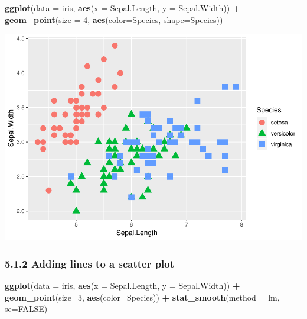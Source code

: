 \documentclass[]{article}
\newenvironment{Shaded}{\begin{snugshade}}{\end{snugshade}}
\newcommand{\KeywordTok}[1]{\textcolor[rgb]{0.13,0.29,0.53}{\textbf{#1}}}
\newcommand{\DataTypeTok}[1]{\textcolor[rgb]{0.13,0.29,0.53}{#1}}
\newcommand{\DecValTok}[1]{\textcolor[rgb]{0.00,0.00,0.81}{#1}}
\newcommand{\StringTok}[1]{\textcolor[rgb]{0.31,0.60,0.02}{#1}}
\newcommand{\OtherTok}[1]{\textcolor[rgb]{0.56,0.35,0.01}{#1}}
\newcommand{\OperatorTok}[1]{\textcolor[rgb]{0.81,0.36,0.00}{\textbf{#1}}}
\newcommand{\NormalTok}[1]{#1}
\begin{document}
\begin{Shaded}
\begin{Highlighting}[]
\KeywordTok{ggplot}\NormalTok{(}\DataTypeTok{data =}\NormalTok{ iris, }\KeywordTok{aes}\NormalTok{(}\DataTypeTok{x =}\NormalTok{ Sepal.Length, }\DataTypeTok{y =}\NormalTok{ Sepal.Width)) }\OperatorTok{+}
\StringTok{       }\KeywordTok{geom_point}\NormalTok{(}\DataTypeTok{size =} \DecValTok{4}\NormalTok{, }\KeywordTok{aes}\NormalTok{(}\DataTypeTok{color=}\NormalTok{Species, }\DataTypeTok{shape=}\NormalTok{Species))}
\end{Highlighting}
\end{Shaded}

\includegraphics{stt-301-programming_files/figure-latex/unnamed-chunk-58-1.pdf}

\subsubsection{5.1.2 Adding lines to a scatter
plot}\label{adding-lines-to-a-scatter-plot}

\begin{Shaded}
\begin{Highlighting}[]
\KeywordTok{ggplot}\NormalTok{(}\DataTypeTok{data =}\NormalTok{ iris, }\KeywordTok{aes}\NormalTok{(}\DataTypeTok{x =}\NormalTok{ Sepal.Length, }\DataTypeTok{y =}\NormalTok{ Sepal.Width)) }\OperatorTok{+}
\StringTok{       }\KeywordTok{geom_point}\NormalTok{(}\DataTypeTok{size=}\DecValTok{3}\NormalTok{, }\KeywordTok{aes}\NormalTok{(}\DataTypeTok{color=}\NormalTok{Species)) }\OperatorTok{+}
\StringTok{       }\KeywordTok{stat_smooth}\NormalTok{(}\DataTypeTok{method =}\NormalTok{ lm, }\DataTypeTok{se=}\OtherTok{FALSE}\NormalTok{)}
\end{Highlighting}
\end{Shaded}
\end{document}

